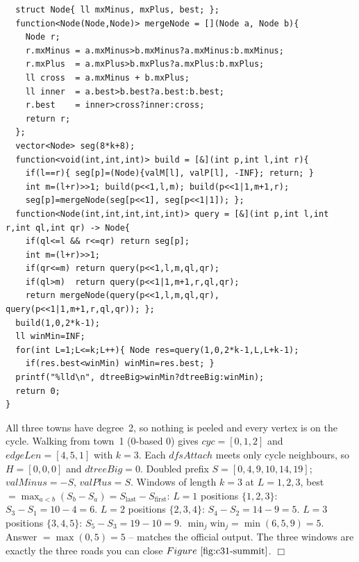 \begin{lstlisting}
  struct Node{ ll mxMinus, mxPlus, best; };
  function<Node(Node,Node)> mergeNode = [](Node a, Node b){
    Node r;
    r.mxMinus = a.mxMinus>b.mxMinus?a.mxMinus:b.mxMinus;
    r.mxPlus  = a.mxPlus>b.mxPlus?a.mxPlus:b.mxPlus;
    ll cross  = a.mxMinus + b.mxPlus;
    ll inner  = a.best>b.best?a.best:b.best;
    r.best    = inner>cross?inner:cross;
    return r;
  };
  vector<Node> seg(8*k+8);
  function<void(int,int,int)> build = [&](int p,int l,int r){
    if(l==r){ seg[p]=(Node){valM[l], valP[l], -INF}; return; }
    int m=(l+r)>>1; build(p<<1,l,m); build(p<<1|1,m+1,r);
    seg[p]=mergeNode(seg[p<<1], seg[p<<1|1]); };
  function<Node(int,int,int,int,int)> query = [&](int p,int l,int r,int ql,int qr) -> Node{
    if(ql<=l && r<=qr) return seg[p];
    int m=(l+r)>>1;
    if(qr<=m) return query(p<<1,l,m,ql,qr);
    if(ql>m)  return query(p<<1|1,m+1,r,ql,qr);
    return mergeNode(query(p<<1,l,m,ql,qr), query(p<<1|1,m+1,r,ql,qr)); };
  build(1,0,2*k-1);
  ll winMin=INF;
  for(int L=1;L<=k;L++){ Node res=query(1,0,2*k-1,L,L+k-1);
    if(res.best<winMin) winMin=res.best; }
  printf("%lld\n", dtreeBig>winMin?dtreeBig:winMin);
  return 0;
}
\end{lstlisting}

\begin{tracebox}[Sample 1: \(n{=}3\) triangle -- every \(h_i{=}0\), a pure cycle-window minimum]
All three towns have degree~2, so nothing is peeled and every vertex is on the
cycle.  Walking from town~1 (0-based 0) gives \(\mathit{cyc}{=}[0,1,2]\) and
\(\mathit{edgeLen}{=}[4,5,1]\) with \(k{=}3\).  Each \(\mathit{dfsAttach}\) meets only cycle
neighbours, so \(H{=}[0,0,0]\) and \(\mathit{dtreeBig}{=}0\).
Doubled prefix \(S=[0,4,9,10,14,19]\); \(\mathit{valMinus}=-S\), \(\mathit{valPlus}=S\).
Windows of length \(k{=}3\) at \(L{=}1,2,3\), best \(=\max_{a<b}(S_b-S_a)=S_{\text{last}}-S_{\text{first}}\):
\(L{=}1\) positions \(\{1,2,3\}\): \(S_3{-}S_1=10{-}4=6\).
\(L{=}2\) positions \(\{2,3,4\}\): \(S_4{-}S_2=14{-}9=5\).
\(L{=}3\) positions \(\{3,4,5\}\): \(S_5{-}S_3=19{-}10=9\).
\(\min_j\mathrm{win}_j=\min(6,5,9)=5\).  Answer \(=\max(0,5)=\boxed{5}\) -- matches the
official output.  The three windows are exactly the three roads you can close
\(\figref{c31-summit}\). \(\Box\)
\end{tracebox}

